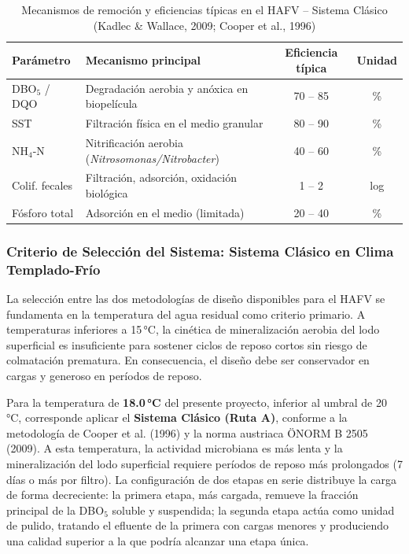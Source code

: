 \documentclass[12pt,a4paper]{article}
\begin{document}
\begin{table}[H]
\centering
\caption{Mecanismos de remoción y eficiencias típicas en el HAFV -- Sistema Clásico (Kadlec \& Wallace, 2009; Cooper et al., 1996)}
\label{tab:mecanismos_hafv_a}
\begin{tabular}{p{2.2cm}p{6.5cm}cc}
\toprule
\textbf{Parámetro} & \textbf{Mecanismo principal} & \textbf{Eficiencia típica} & \textbf{Unidad} \\
\midrule
DBO$_5$ / DQO & Degradación aerobia y anóxica en biopelícula & 70 -- 85 & \% \\
SST & Filtración física en el medio granular & 80 -- 90 & \% \\
NH$_4$-N & Nitrificación aerobia (\textit{Nitrosomonas/Nitrobacter}) & 40 -- 60 & \% \\
Colif. fecales & Filtración, adsorción, oxidación biológica & 1 -- 2 & log \\
Fósforo total & Adsorción en el medio (limitada) & 20 -- 40 & \% \\
\bottomrule
\end{tabular}
\end{table}

\subsubsection*{Criterio de Selección del Sistema: Sistema Clásico en Clima Templado-Frío}

La selección entre las dos metodologías de diseño disponibles para el HAFV se fundamenta en la temperatura del agua residual como criterio primario. A temperaturas inferiores a 15\,°C, la cinética de mineralización aerobia del lodo superficial es insuficiente para sostener ciclos de reposo cortos sin riesgo de colmatación prematura. En consecuencia, el diseño debe ser conservador en cargas y generoso en períodos de reposo.

Para la temperatura de \textbf{18.0\,°C} del presente proyecto, inferior al umbral de 20\,°C, corresponde aplicar el \textbf{Sistema Clásico (Ruta A)}, conforme a la metodología de Cooper et al. (1996) y la norma austriaca ÖNORM B 2505 (2009). A esta temperatura, la actividad microbiana es más lenta y la mineralización del lodo superficial requiere períodos de reposo más prolongados (7 días o más por filtro). La configuración de dos etapas en serie distribuye la carga de forma decreciente: la primera etapa, más cargada, remueve la fracción principal de la DBO$_5$ soluble y suspendida; la segunda etapa actúa como unidad de pulido, tratando el efluente de la primera con cargas menores y produciendo una calidad superior a la que podría alcanzar una etapa única.
\end{document}
